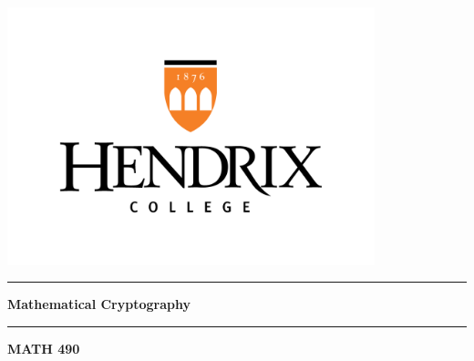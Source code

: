 \documentclass[12pt, oneside]{book}
\begin{document}

\newcommand{\titlestandin}[0]{Mathematical Cryptography}
\newcommand{\cussubtitle}[0]{MATH 490}
\newcommand{\startdate}[0]{August 26, 2024}
\newcommand{\customenddate}[0]{December 2, 2024}
\newcommand{\professor}[0]{Prof. Allie Ray, Ph.D.}




\begin{titlepage}
    \begin{center}

        \vspace*{-2cm}
        \includegraphics[width=0.8\textwidth]{images/Hendrix Logo.png}\\
        \vfill

        \textcolor{horange}{\rule{\textwidth}{1.0pt}}

        \vspace{2em}

        {\huge \textbf{\titlestandin}}

        \vspace{1em} %

        \textcolor{horange}{\rule{\textwidth}{1.0pt}}

        \vspace*{1\baselineskip}

        {\LARGE \textbf{\cussubtitle}}


\end{center}
\end{titlepage}
\end{document}
